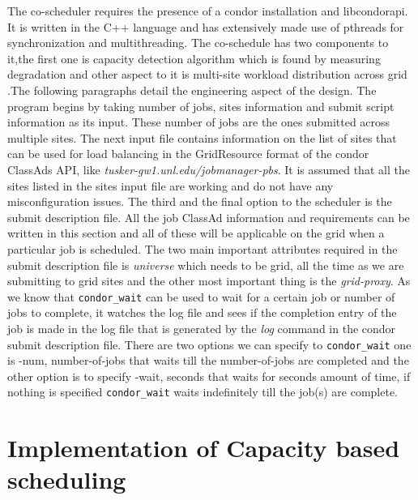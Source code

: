 \documentclass[ms,electronic,double]{nuthesis}
\begin{document}
The co-scheduler requires the presence of a condor installation and libcondorapi.
It is written in the C++ language and has extensively made use of pthreads for 
synchronization and multithreading. The co-schedule has two components to it,the first one is capacity detection
algorithm which is found by measuring degradation and other aspect to it is 
multi-site workload distribution across grid .The following  paragraphs detail the 
engineering aspect of the design.
The program begins by taking number of jobs, sites information and submit script 
information as its input. These number of jobs are the ones submitted across 
multiple sites. The next input file contains information on the list of sites that can be used 
for load balancing in the GridResource format of the condor ClassAds API, like \emph{tusker-gw1.unl.edu/jobmanager-pbs}.
It is assumed that all the sites listed in the sites input file are working and 
do not have any misconfiguration issues. The third and the final option to the 
scheduler is the submit description file. All the job ClassAd information and 
requirements can be written in this section and all of these will be applicable on the grid when a particular job is 
scheduled. The two main important attributes required in the submit description 
file is \emph{universe} which needs to be grid, all the time as we are submitting 
to grid sites and the other most important thing is the 
\emph{grid-proxy}. 
As we know that \texttt{condor\_wait} \cite{manual56}can be used to wait for a certain job or 
number of jobs to complete, it watches the log file and sees if the completion 
entry of the job is made in the log file that is generated by the \emph{log} 
command in the condor submit description file. There are two options we can 
specify to \texttt{condor\_wait} one is -num, number-of-jobs that waits
till the number-of-jobs are completed and the other option is to specify -wait, seconds that 
waits for seconds amount of time, if nothing is specified \texttt{condor\_wait} waits indefinitely till
the job(s) are complete.

\section{Implementation of Capacity based scheduling}
\end{document}

